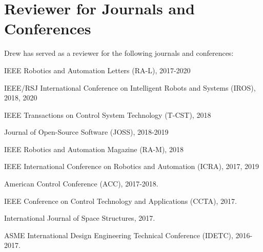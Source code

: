 \documentclass[letterpaper]{deedy-resume} %
\begin{document}
{\begin{etaremune}[itemsep=0.1cm]
 \end{etaremune}

\sectionspace


\section{Reviewer for Journals and Conferences}

\vspace{0.1cm}

Drew has served as a reviewer for the following journals and conferences:

\vspace{0.1cm}

\begin{tightitemize}

\item IEEE Robotics and Automation Letters (RA-L), 2017-2020

\item IEEE/RSJ International Conference on Intelligent Robots and Systems (IROS), 2018, 2020

\item IEEE Transactions on Control System Technology (T-CST), 2018

\item Journal of Open-Source Software (JOSS), 2018-2019
  
\item IEEE Robotics and Automation Magazine (RA-M), 2018
  
\item IEEE International Conference on Robotics and Automation (ICRA), 2017, 2019

\item American Control Conference (ACC), 2017-2018.

\item IEEE Conference on Control Technology and Applications (CCTA), 2017.

\item International Journal of Space Structures, 2017.

\item ASME International Design Engineering Technical Conference (IDETC), 2016-2017.

\end{tightitemize}

}
\end{document}
